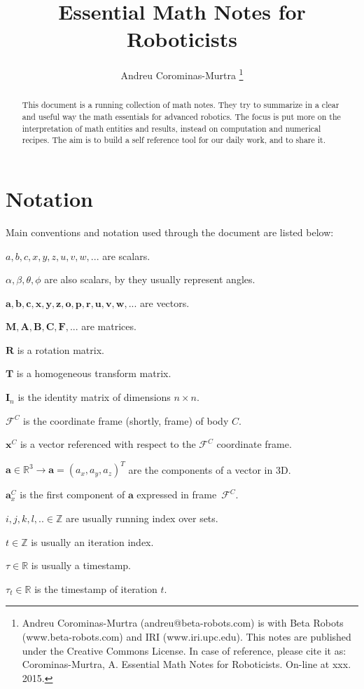 \documentclass[a4paper,11pt]{article}
\title{Essential Math Notes for Roboticists}
\author{
  Andreu Corominas-Murtra
  \thanks{
    Andreu Corominas-Murtra (andreu@beta-robots.com) is with Beta Robots (www.beta-robots.com) and IRI (www.iri.upc.edu).
    This notes are published under the Creative Commons License. In case of reference, please cite it as: Corominas-Murtra, A. Essential Math Notes for Roboticists. On-line at xxx. 2015. }
}
\begin{document}
\maketitle

\begin{abstract}
This document is a running collection of math notes. They try to summarize in a clear and useful way the math essentials for advanced robotics. The focus is put more on the interpretation of math entities and results, instead on computation and numerical recipes. The aim is to build a self reference tool for our daily work, and to share it. 
\end{abstract}

\newpage

\tableofcontents

\newpage
\section{Notation}
Main conventions and notation used through the document are listed below:

$a,b,c,x,y,z,u,v,w,...$ are scalars.

$\alpha,\beta,\theta,\phi$ are also scalars, by they usually represent angles. 

$\mathbf{a,b,c,x,y,z,o,p,r,u,v,w,...}$ are vectors.

$\mathbf{M,A,B,C,F,...}$ are matrices.

$\mathbf{R}$ is a rotation matrix.

$\mathbf{T}$ is a homogeneous transform matrix.

$\mathbf{I}_n$ is the identity matrix of dimensions $n \times n$.

$\mathcal{F}^C$ is the coordinate frame (shortly, frame) of body $C$.

$\mathbf{x}^C$ is a vector referenced with respect to the $\mathcal{F}^C$ coordinate frame.

$\mathbf{a}\in \mathbb{R}^3 \rightarrow \mathbf{a} = (a_x,a_y,a_z)^T$ are the components of a vector in 3D.

$\mathbf{a}^C_x$ is the first component of $\mathbf{a}$ expressed in frame~$\mathcal{F}^C$.

$i,j,k,l,.. \in \mathbb{Z}$ are usually running index over sets. 

$t \in \mathbb{Z}$ is usually an iteration index.

$\tau \in \mathbb{R}$ is usually a timestamp.

$\tau_t \in \mathbb{R}$ is the timestamp of iteration $t$.
\end{document}
